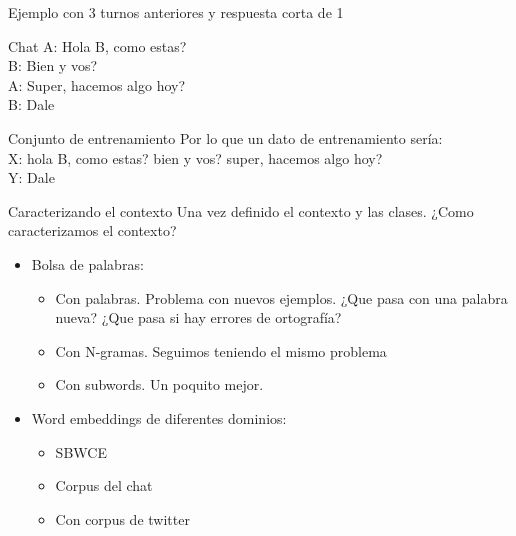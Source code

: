 \documentclass{beamer}
\begin{document}
\begin{frame}{Ejemplo con 3 turnos anteriores y respuesta corta de 1}
	\begin{block}{Chat}
		A: Hola B, como estas? \\
    	B: Bien y vos? \\
    	A: Super, hacemos algo hoy? \\
    	B: Dale \\
    \end{block}
    \begin{block}{Conjunto de entrenamiento}
    	Por lo que un dato de entrenamiento sería: \\
   		X: hola B, como estas? bien y vos? super, hacemos algo hoy? \\
    	Y: Dale \\
    \end{block}
\end{frame}

\begin{frame}{Caracterizando el contexto}
	Una vez definido el contexto y las clases. ¿Como caracterizamos el contexto?
    \pause
	\begin{block}{}
        \begin{itemize}
    		\item Bolsa de palabras:
            \begin{itemize}
            	\item Con palabras. Problema con nuevos ejemplos. ¿Que pasa con una palabra nueva? ¿Que pasa si hay errores de ortografía?
                \pause
                \item Con N-gramas. Seguimos teniendo el mismo problema
                \pause
                \item Con subwords. Un poquito mejor.
            \end{itemize}
            \pause
         	\item Word embeddings de diferentes dominios:
         	\begin{itemize}
            	\item SBWCE
            	\item Corpus del chat
                \item Con corpus de twitter
         	\end{itemize}
		\end{itemize}
	\end{block}
\end{frame}
\end{document}
